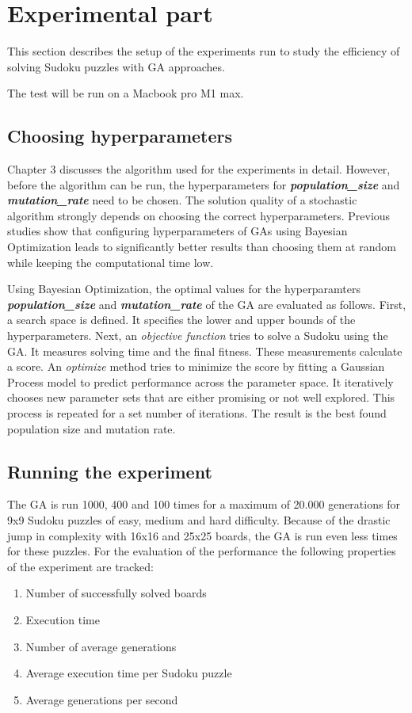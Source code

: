 \section{Experimental part}
\label{sec:experimentation}

This section describes the setup of the experiments run to study the efficiency of solving Sudoku puzzles with GA approaches.

The test will be run on a Macbook pro M1 max.

\subsection{Choosing hyperparameters}
Chapter 3 discusses the algorithm used for the experiments in detail. However, before the algorithm can be run, the hyperparameters for \textit{\textbf{population\_size}} and \textit{\textbf{mutation\_rate}} need to be chosen. The solution quality of a stochastic algorithm strongly depends on choosing the correct hyperparameters. Previous studies show that configuring hyperparameters of GAs using Bayesian Optimization leads to significantly better results than choosing them at random while keeping the computational time low\cite{Ruether}.

Using Bayesian Optimization, the optimal values for the hyperparamters \textit{\textbf{population\_size}} and \textit{\textbf{mutation\_rate}} of the GA are evaluated as follows. First, a search space is defined. It specifies the lower and upper bounds of the hyperparameters. Next, an \textit{objective function} tries to solve a Sudoku using the GA. It measures solving time and the final fitness. These measurements calculate a score. An \textit{optimize} method tries to minimize the score by fitting a Gaussian Process model to predict performance across the parameter space. It iteratively chooses new parameter sets that are either promising or not well explored. This process is repeated for a set number of iterations. The result is the best found population size and mutation rate. 

\subsection{Running the experiment}
The GA is run 1000, 400 and 100 times for a maximum of 20.000 generations for 9x9 Sudoku puzzles of easy, medium and hard difficulty. Because of the drastic jump in complexity with 16x16 and 25x25 boards, the GA is run even less times for these puzzles. For the evaluation of the performance the following properties of the experiment are tracked:
\begin{enumerate}
	\item Number of successfully solved boards
	\item Execution time
	\item Number of average generations
	\item Average execution time per Sudoku puzzle
	\item Average generations per second
\end{enumerate}

